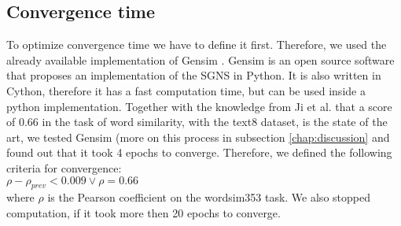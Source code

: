\subsection{Convergence time}
To optimize convergence time we have to define it first. Therefore, we used the already available implementation of Gensim \cite{gensim}. Gensim is an open source software that proposes an implementation of the SGNS in Python. It is also written in Cython, therefore it has a fast computation time, but can be used inside a python implementation. Together with the knowledge from Ji et al.\cite{intel} that a score of $0.66$ in the task of word similarity, with the text8 dataset, is the state of the art, we tested Gensim (more on this process in subsection \ref{chap:discussion} and found out that it took 4 epochs to converge. Therefore, we defined the following criteria for convergence: \\
$\rho - \rho_{prev} < 0.009 \vee \rho = 0.66$ \\
where $\rho$ is the Pearson coefficient on the wordsim353 task.
We also stopped computation, if it took more then 20 epochs to converge.
